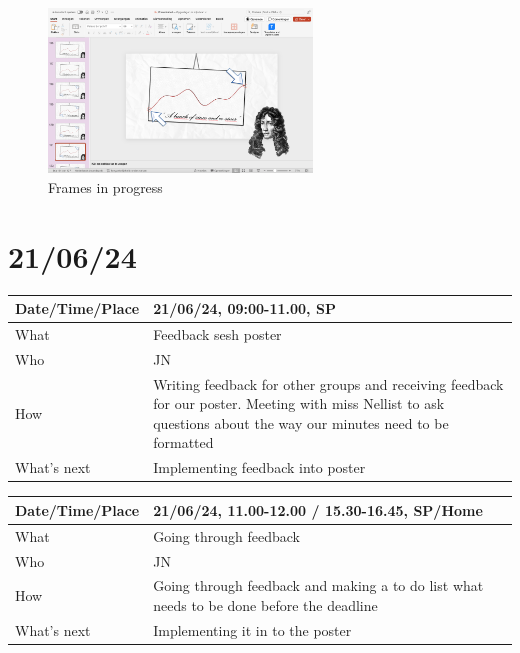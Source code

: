 \documentclass{article}
\begin{document}
\begin{figure}[H]
    \centering
    \includegraphics[width=7cm]{Foto animatie.png}
    \caption{Frames in progress}   
\end{figure}

\section{21/06/24}

\begin{table}[H]
\begin{tabular}{|p{1.5in}|p{4in}|}
\hline
Date/Time/Place & 21/06/24, 09:00-11.00, SP \\ \hline
What            & Feedback sesh poster \\ \hline
Who             & JN \\ \hline
How             & Writing feedback for other groups and receiving feedback for our poster. Meeting with miss Nellist to ask questions about the way our minutes need to be formatted \\ \hline
What's next     & Implementing feedback into poster \\ \hline
\end{tabular}
\end{table}

\begin{table}[H]
\begin{tabular}{|p{1.5in}|p{4in}|}
\hline
Date/Time/Place & 21/06/24, 11.00-12.00 / 15.30-16.45, SP/Home \\ \hline
What            & Going through feedback \\ \hline
Who             & JN \\ \hline
How             & Going through feedback and making a to do list what needs to be done before the deadline \\ \hline
What's next     & Implementing it in to the poster \\ \hline
\end{tabular}
\end{table}
\end{document}
